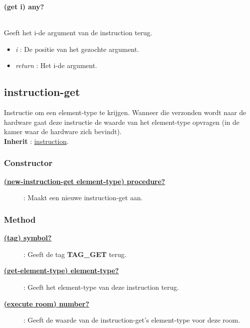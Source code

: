 \documentclass{article}
\newcommand{\ar}{\ding{213} }
\newcommand{\code}[1]{\textcolor{code}{#1}}
\newcommand{\lb}[1][]{\code{(#1}}
\newcommand{\rb}{\code{)}}
\newcommand{\racket}[1]{
	{\color{blue}\textbf{#1}}
}
\begin{document}
\begin{framed}
	\hypertarget{instruction:get}{\racket{\lb[get] i\rb \ar \code{any?}}}
	\\Geeft het i-de argument van de instruction terug.
	\begin{itemize}
		\item \emph{i} : De positie van het gezochte argument.
		\item \emph{return} : Het i-de argument.
	\end{itemize}
\end{framed}

\newpage
\hypertarget{instruction-get}{\subsection{instruction-get}}
Instructie om een element-type te krijgen. Wanneer die verzonden wordt naar de hardware gaat deze instructie de waarde van het element-type opvragen (in de kamer waar de hardware zich bevindt).
\\\textbf{Inherit} : \hyperlink{instruction}{instruction}.

\subsubsection{Constructor}
\begin{description}
	\item[\hyperlink{instruction-get:new-instruction-get}{\racket{\lb[new-instruction-get] element-type\rb \ar \code{procedure?}}}] : Maakt een nieuwe instruction-get aan.
\end{description}

\subsubsection{Method}
\begin{description}
	\item[\hyperlink{instruction-get:tag}{\racket{\lb[tag]\rb \ar \code{symbol?}}}] : Geeft de tag \racket{TAG\_GET} terug.
	\item[\hyperlink{instruction-get:get-element-type}{\racket{\lb[get-element-type]\rb \ar \code{element-type?}}}] : Geeft het element-type van deze instruction terug.
	\item[\hyperlink{instruction-get:execute}{\racket{\lb[execute] room\rb \ar \code{number?}}}] : Geeft de waarde van de instruction-get's element-type voor deze room.
\end{description}
\end{document}
